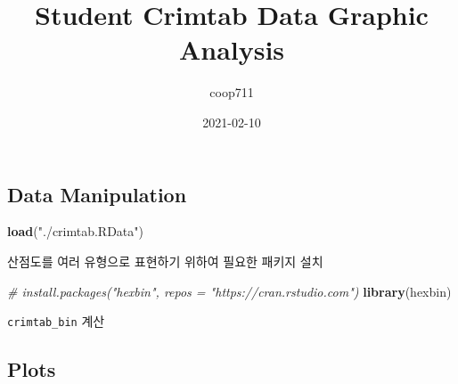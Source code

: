 \documentclass[
]{article}
\title{Student Crimtab Data Graphic Analysis}
\author{coop711}
\date{2021-02-10}
\newenvironment{Shaded}{\begin{snugshade}}{\end{snugshade}}
\newcommand{\CommentTok}[1]{\textcolor[rgb]{0.56,0.35,0.01}{\textit{#1}}}
\newcommand{\DataTypeTok}[1]{\textcolor[rgb]{0.13,0.29,0.53}{#1}}
\newcommand{\DecValTok}[1]{\textcolor[rgb]{0.00,0.00,0.81}{#1}}
\newcommand{\KeywordTok}[1]{\textcolor[rgb]{0.13,0.29,0.53}{\textbf{#1}}}
\newcommand{\NormalTok}[1]{#1}
\newcommand{\OperatorTok}[1]{\textcolor[rgb]{0.81,0.36,0.00}{\textbf{#1}}}
\newcommand{\StringTok}[1]{\textcolor[rgb]{0.31,0.60,0.02}{#1}}
\begin{document}
\maketitle

\hypertarget{data-manipulation}{%
\subsection{Data Manipulation}\label{data-manipulation}}

\begin{Shaded}
\begin{Highlighting}[]
\KeywordTok{load}\NormalTok{(}\StringTok{"./crimtab.RData"}\NormalTok{)}
\end{Highlighting}
\end{Shaded}

산점도를 여러 유형으로 표현하기 위하여 필요한 패키지 설치

\begin{Shaded}
\begin{Highlighting}[]
\CommentTok{# install.packages("hexbin", repos = "https://cran.rstudio.com")}
\KeywordTok{library}\NormalTok{(hexbin)}
\end{Highlighting}
\end{Shaded}

\texttt{crimtab\_bin} 계산

\begin{Shaded}
\end{Shaded}

\hypertarget{plots}{%
\subsection{Plots}\label{plots}}
\end{document}
